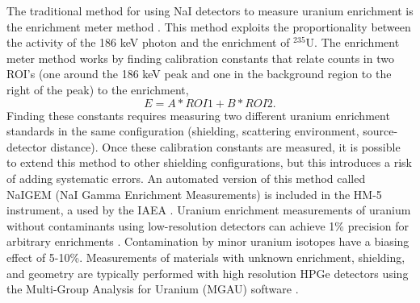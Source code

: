 The traditional method for using NaI detectors to measure uranium enrichment is the enrichment meter method \cite{Reilly1970}. This method exploits the proportionality between the activity of the 186 keV photon and the enrichment of $^{235}$U. The enrichment meter method works by finding calibration constants that relate counts in two ROI's (one around the 186 keV peak and one in the background region to the right of the peak) to the enrichment,
%
\begin{equation} \label{eq:enrichment_meter_principle}
E = A * ROI1 + B * ROI2.
\end{equation}
%
Finding these constants requires measuring two different uranium enrichment standards in the same configuration (shielding, scattering environment, source-detector distance). Once these calibration constants are measured, it is possible to extend this method to other shielding configurations, but this introduces a risk of adding systematic errors. An automated version of this method called NaIGEM (NaI Gamma Enrichment Measurements) is included in the HM-5 instrument, a  used by the IAEA \cite{MORTREAU2004}. Uranium enrichment measurements of uranium without contaminants using low-resolution detectors can achieve 1\% precision for arbitrary enrichments \cite{SPRINKLE1997}. Contamination by minor uranium isotopes have a biasing effect of 5-10\%. Measurements of materials with unknown enrichment, shielding, and geometry are typically performed with high resolution HPGe detectors using the Multi-Group Analysis for Uranium (MGAU) software \cite{MGAU1994}.





